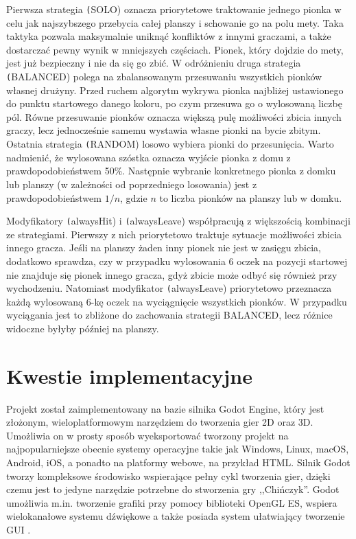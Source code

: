 \documentclass[conference]{IEEEtran}
\begin{document}
Pierwsza strategia \texttt(SOLO) oznacza priorytetowe traktowanie jednego pionka w celu jak najszybszego przebycia całej planszy i schowanie go na polu mety. Taka taktyka pozwala maksymalnie uniknąć konfliktów z innymi graczami, a także dostarczać pewny wynik w mniejszych częściach. Pionek, który dojdzie do mety, jest już bezpieczny i nie da się go zbić. W odróżnieniu druga strategia \texttt(BALANCED) polega na zbalansowanym przesuwaniu wszystkich pionków własnej drużyny. Przed ruchem algorytm wykrywa pionka najbliżej ustawionego do punktu startowego danego koloru, po czym przesuwa go o wylosowaną liczbę pól. Równe przesuwanie pionków oznacza większą pulę możliwości zbicia innych graczy, lecz jednocześnie samemu wystawia własne pionki na bycie zbitym. Ostatnia strategia \texttt(RANDOM) losowo wybiera pionki do przesunięcia. Warto nadmienić, że wylosowana szóstka oznacza wyjście pionka z domu z prawdopodobieństwem 50\%. Następnie wybranie konkretnego pionka z domku lub planszy (w zależności od poprzedniego losowania) jest z prawdopodobieństwem $1 / n$, gdzie $n$ to liczba pionków na planszy lub w domku.


Modyfikatory \texttt(alwaysHit) i \texttt(alwaysLeave) współpracują z większością kombinacji ze strategiami. Pierwszy z nich priorytetowo traktuje sytuacje możliwości zbicia innego gracza. Jeśli na planszy żaden inny pionek nie jest w zasięgu zbicia, dodatkowo sprawdza, czy w przypadku wylosowania 6 oczek na pozycji startowej nie znajduje się pionek innego gracza, gdyż zbicie może odbyć się również przy wychodzeniu. Natomiast modyfikator \texttt(alwaysLeave) priorytetowo przeznacza każdą wylosowaną 6-kę oczek na wyciągnięcie wszystkich pionków. W przypadku wyciągania jest to zbliżone do zachowania strategii BALANCED, lecz różnice widoczne byłyby później na planszy.

\section{Kwestie implementacyjne}
Projekt został zaimplementowany na bazie silnika Godot Engine, który jest złożonym, wieloplatformowym narzędziem do tworzenia gier 2D oraz 3D. Umożliwia on w prosty sposób wyeksportować tworzony projekt na najpopularniejsze obecnie systemy operacyjne takie jak Windows, Linux, macOS, Android, iOS, a ponadto na platformy webowe, na przykład HTML. Silnik Godot tworzy kompleksowe środowisko wspierające pełny cykl tworzenia gier, dzięki czemu jest to jedyne narzędzie potrzebne do stworzenia gry ,,Chińczyk''. Godot umożliwia m.in. tworzenie grafiki przy pomocy biblioteki OpenGL ES, wspiera wielokanałowe systemu dźwiękowe a także posiada system ułatwiający tworzenie GUI \cite{godot}.
\end{document}
